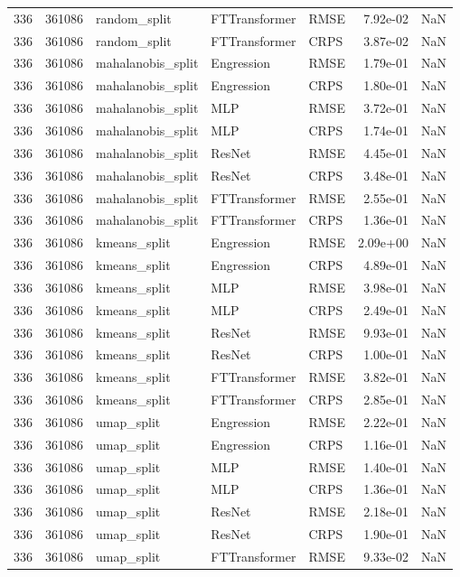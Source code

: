 \begin{tabular}{rrlllrr}
336 & 361086 & random\_split & FTTransformer & RMSE & 7.92e-02 & NaN \\
336 & 361086 & random\_split & FTTransformer & CRPS & 3.87e-02 & NaN \\
336 & 361086 & mahalanobis\_split & Engression & RMSE & 1.79e-01 & NaN \\
336 & 361086 & mahalanobis\_split & Engression & CRPS & 1.80e-01 & NaN \\
336 & 361086 & mahalanobis\_split & MLP & RMSE & 3.72e-01 & NaN \\
336 & 361086 & mahalanobis\_split & MLP & CRPS & 1.74e-01 & NaN \\
336 & 361086 & mahalanobis\_split & ResNet & RMSE & 4.45e-01 & NaN \\
336 & 361086 & mahalanobis\_split & ResNet & CRPS & 3.48e-01 & NaN \\
336 & 361086 & mahalanobis\_split & FTTransformer & RMSE & 2.55e-01 & NaN \\
336 & 361086 & mahalanobis\_split & FTTransformer & CRPS & 1.36e-01 & NaN \\
336 & 361086 & kmeans\_split & Engression & RMSE & 2.09e+00 & NaN \\
336 & 361086 & kmeans\_split & Engression & CRPS & 4.89e-01 & NaN \\
336 & 361086 & kmeans\_split & MLP & RMSE & 3.98e-01 & NaN \\
336 & 361086 & kmeans\_split & MLP & CRPS & 2.49e-01 & NaN \\
336 & 361086 & kmeans\_split & ResNet & RMSE & 9.93e-01 & NaN \\
336 & 361086 & kmeans\_split & ResNet & CRPS & 1.00e-01 & NaN \\
336 & 361086 & kmeans\_split & FTTransformer & RMSE & 3.82e-01 & NaN \\
336 & 361086 & kmeans\_split & FTTransformer & CRPS & 2.85e-01 & NaN \\
336 & 361086 & umap\_split & Engression & RMSE & 2.22e-01 & NaN \\
336 & 361086 & umap\_split & Engression & CRPS & 1.16e-01 & NaN \\
336 & 361086 & umap\_split & MLP & RMSE & 1.40e-01 & NaN \\
336 & 361086 & umap\_split & MLP & CRPS & 1.36e-01 & NaN \\
336 & 361086 & umap\_split & ResNet & RMSE & 2.18e-01 & NaN \\
336 & 361086 & umap\_split & ResNet & CRPS & 1.90e-01 & NaN \\
336 & 361086 & umap\_split & FTTransformer & RMSE & 9.33e-02 & NaN \\

\end{tabular}
